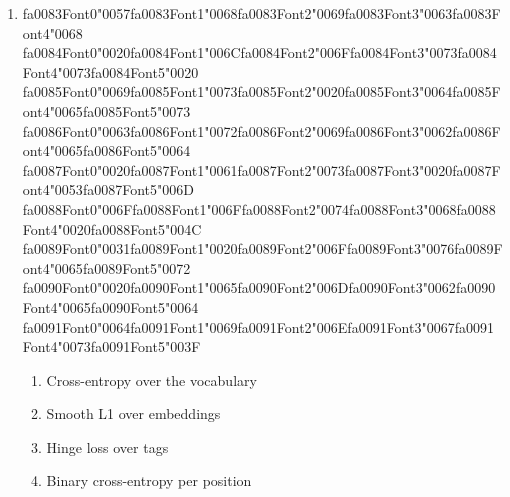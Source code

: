\documentclass[12pt]{article}
\begin{document}
\begin{enumerate}[label=Q\arabic*.]
 \item {\csname fa0083Font0\endcsname\char"0057}{\csname fa0083Font1\endcsname\char"0068}{\csname fa0083Font2\endcsname\char"0069}{\csname fa0083Font3\endcsname\char"0063}{\csname fa0083Font4\endcsname\char"0068} {\csname fa0084Font0\endcsname\char"0020}{\csname fa0084Font1\endcsname\char"006C}{\csname fa0084Font2\endcsname\char"006F}{\csname fa0084Font3\endcsname\char"0073}{\csname fa0084Font4\endcsname\char"0073}{\csname fa0084Font5\endcsname\char"0020} {\csname fa0085Font0\endcsname\char"0069}{\csname fa0085Font1\endcsname\char"0073}{\csname fa0085Font2\endcsname\char"0020}{\csname fa0085Font3\endcsname\char"0064}{\csname fa0085Font4\endcsname\char"0065}{\csname fa0085Font5\endcsname\char"0073} {\csname fa0086Font0\endcsname\char"0063}{\csname fa0086Font1\endcsname\char"0072}{\csname fa0086Font2\endcsname\char"0069}{\csname fa0086Font3\endcsname\char"0062}{\csname fa0086Font4\endcsname\char"0065}{\csname fa0086Font5\endcsname\char"0064} {\csname fa0087Font0\endcsname\char"0020}{\csname fa0087Font1\endcsname\char"0061}{\csname fa0087Font2\endcsname\char"0073}{\csname fa0087Font3\endcsname\char"0020}{\csname fa0087Font4\endcsname\char"0053}{\csname fa0087Font5\endcsname\char"006D} {\csname fa0088Font0\endcsname\char"006F}{\csname fa0088Font1\endcsname\char"006F}{\csname fa0088Font2\endcsname\char"0074}{\csname fa0088Font3\endcsname\char"0068}{\csname fa0088Font4\endcsname\char"0020}{\csname fa0088Font5\endcsname\char"004C} {\csname fa0089Font0\endcsname\char"0031}{\csname fa0089Font1\endcsname\char"0020}{\csname fa0089Font2\endcsname\char"006F}{\csname fa0089Font3\endcsname\char"0076}{\csname fa0089Font4\endcsname\char"0065}{\csname fa0089Font5\endcsname\char"0072} {\csname fa0090Font0\endcsname\char"0020}{\csname fa0090Font1\endcsname\char"0065}{\csname fa0090Font2\endcsname\char"006D}{\csname fa0090Font3\endcsname\char"0062}{\csname fa0090Font4\endcsname\char"0065}{\csname fa0090Font5\endcsname\char"0064} {\csname fa0091Font0\endcsname\char"0064}{\csname fa0091Font1\endcsname\char"0069}{\csname fa0091Font2\endcsname\char"006E}{\csname fa0091Font3\endcsname\char"0067}{\csname fa0091Font4\endcsname\char"0073}{\csname fa0091Font5\endcsname\char"003F}
 \begin{enumerate}[label=(\Alph*)]
     \item Cross-entropy over the vocabulary
     \item Smooth L1 over embeddings
     \item Hinge loss over tags
     \item Binary cross-entropy per position
 \end{enumerate}
 

\end{enumerate}
\end{document}

